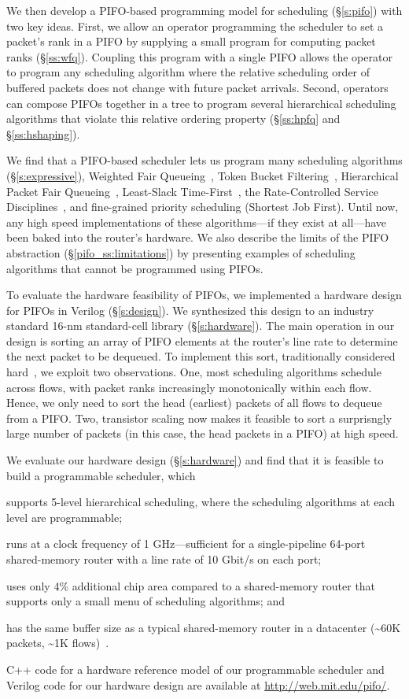 We then develop a PIFO-based programming model for scheduling (\S\ref{s:pifo})
with two key ideas. First, we allow an operator programming the scheduler to
set a packet's rank in a PIFO by supplying a small program for computing packet
ranks (\S\ref{ss:wfq}).  Coupling this program with a single PIFO allows the
operator to program any scheduling algorithm where the relative scheduling
order of buffered packets does not change with future packet arrivals. Second,
operators can compose PIFOs together in a tree to program several hierarchical
scheduling algorithms that violate this relative ordering property
(\S\ref{ss:hpfq} and \S\ref{ss:hshaping}).

We find that a PIFO-based scheduler lets us program many scheduling algorithms
(\S\ref{s:expressive}), \eg Weighted Fair Queueing~\cite{wfq}, Token Bucket
Filtering~\cite{tbf}, Hierarchical Packet Fair Queueing~\cite{hpfq},
Least-Slack Time-First~\cite{lstf}, the Rate-Controlled Service
Disciplines~\cite{rcsd}, and fine-grained priority scheduling (\eg Shortest Job
First). Until now, any high speed implementations of these algorithms---if they
exist at all---have been baked into the router's hardware. We also describe the
limits of the PIFO abstraction (\S\ref{pifo_ss:limitations}) by presenting
examples of scheduling algorithms that cannot be programmed using PIFOs.

To evaluate the hardware feasibility of PIFOs, we implemented a hardware design
for PIFOs in Verilog (\S\ref{s:design}). We synthesized this design to an
industry standard 16-nm standard-cell library (\S\ref{s:hardware}). The main
operation in our design is sorting an array of PIFO elements at the router's
line rate to determine the next packet to be dequeued. To implement this sort,
traditionally considered hard~\cite{sfq, drr}, we exploit two observations.
One, most scheduling algorithms schedule across flows, with packet ranks
increasingly monotonically within each flow.  Hence, we only need to sort the
head (earliest) packets of all flows to dequeue from a PIFO.  Two, transistor
scaling now makes it feasible to sort a surprisngly large number of packets (in
this case, the head packets in a PIFO) at high speed.

We evaluate our hardware design (\S\ref{s:hardware}) and find that it is
feasible to build a programmable scheduler, which
\begin{CompactItemize}
  \item supports 5-level hierarchical scheduling, where the scheduling
    algorithms at each level are programmable;
  \item runs at a clock frequency of 1 GHz---sufficient for a single-pipeline
    64-port shared-memory router with a line rate of 10 Gbit/s on each port;
  \item uses only 4\% additional chip area compared to a
    shared-memory router that supports only a small menu of scheduling
    algorithms; and
  \item has the same buffer size as a typical shared-memory router
    in a datacenter (\textasciitilde 60K packets, \textasciitilde 1K flows)~\cite{trident2}.
\end{CompactItemize}

 C++ code for a hardware reference model of our programmable scheduler and
Verilog code for our hardware design are available at
\url{http://web.mit.edu/pifo/}.
